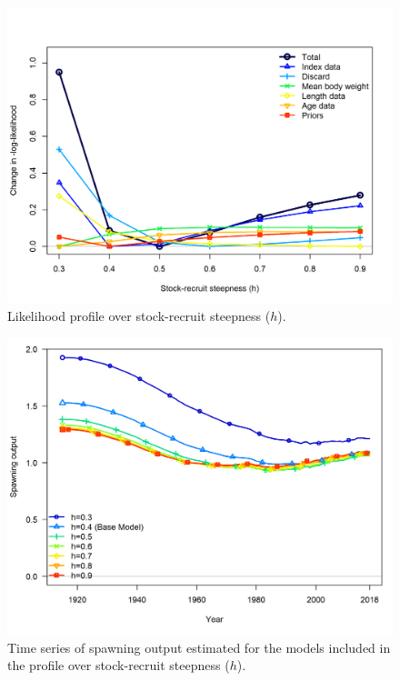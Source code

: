 \documentclass[12pt,]{article}
\begin{document}
\FloatBarrier

\begin{figure}
\centering
\includegraphics{Figures/profile_h.png}
\caption{Likelihood profile over stock-recruit steepness (\(h\)).
\label{fig:profile_h}}
\end{figure}

\begin{figure}
\centering
\includegraphics{Figures/profile_h_compare1_spawnbio.png}
\caption{Time series of spawning output estimated for the models
included in the profile over stock-recruit steepness (\(h\)).
\label{fig:profile_h_compare1_spawnbio}}
\end{figure}
\end{document}
